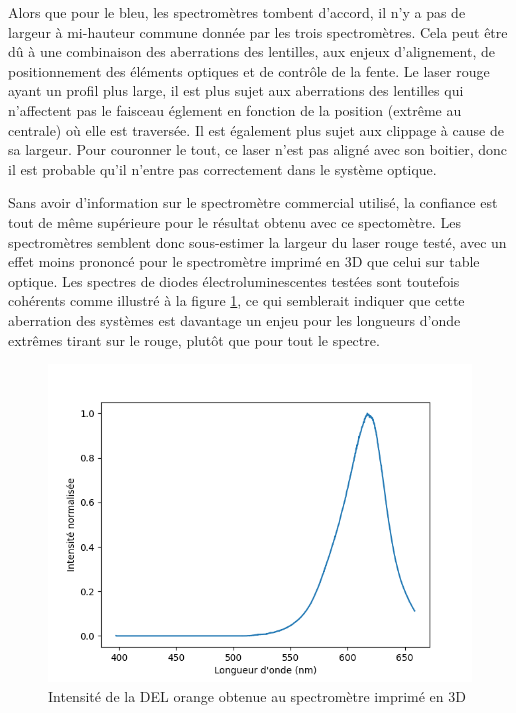 \documentclass[11pt,letterpaper]{article}
\begin{document}
Alors que pour le bleu, les spectromètres tombent d'accord, il n'y a pas de largeur à mi-hauteur
commune donnée par les trois spectromètres. Cela peut être dû à une combinaison des aberrations 
des lentilles, aux enjeux d'alignement, de positionnement des éléments optiques et de contrôle de
la fente. Le laser rouge ayant un profil plus large, il est plus sujet aux aberrations des lentilles
qui n'affectent pas le faisceau églement en fonction de la position (extrême au centrale) où elle
est traversée. Il est également plus sujet aux clippage à cause de sa largeur. Pour couronner le tout,
ce laser n'est pas aligné avec son boitier, donc il est probable qu'il n'entre pas correctement dans
le système optique. 

Sans avoir d'information sur le spectromètre commercial utilisé, la confiance est tout de même supérieure
pour le résultat obtenu avec ce spectomètre. Les spectromètres semblent donc sous-estimer la largeur du
laser rouge testé, avec un effet moins prononcé pour le spectromètre imprimé en 3D que celui sur table optique.
Les spectres de diodes électroluminescentes testées sont toutefois cohérents comme illustré à la figure 
\ref{fig:Int-Del-rousse}, ce qui semblerait indiquer que cette aberration des systèmes est davantage un enjeu
pour les longueurs d'onde extrêmes tirant sur le rouge, plutôt que pour tout le spectre. 

\begin{figure}
  \centering
  \includegraphics[width=0.6\linewidth]{mandat2_ledrousse.png}
  \caption{Intensité de la DEL orange obtenue au spectromètre imprimé en 3D}
  \label{fig:Int-Del-rousse}
\end{figure}

\end{document}
